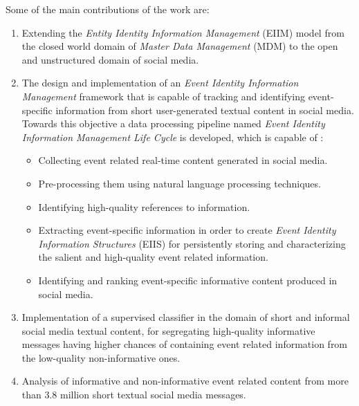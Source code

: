 
Some of the main contributions of the work are:

\begin{enumerate}
\item Extending the \textit{Entity Identity Information Management} (EIIM) model  \cite{zhou2011entity} from the closed world domain of \textit{Master Data Management} (MDM) to the open and unstructured domain of social media.

\item The design and implementation of an \textit{Event Identity Information Management} framework that is capable of tracking and identifying event-specific information from short user-generated textual content in social media. Towards this objective a data processing pipeline named \textit{Event Identity Information Management Life Cycle} is developed, which is capable of :
\begin{itemize}
\item Collecting event related real-time content generated in social media.
\item Pre-processing them using natural language processing techniques.
\item Identifying high-quality references to information.
\item Extracting event-specific information in order to create \textit{Event Identity Information Structures} (EIIS) for persistently storing and characterizing the salient and high-quality event related information. 
\item Identifying and ranking event-specific informative content produced in social media.
\end{itemize}


\item Implementation of a supervised classifier in the domain of short and informal social media textual content, for segregating high-quality informative messages having higher chances of containing event related information from the low-quality non-informative ones. 

\item Analysis of informative and non-informative event related content from more than 3.8 million short textual social media messages.


\end{enumerate}
